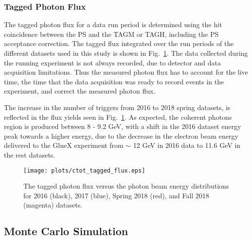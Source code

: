 \subsubsection{Tagged Photon Flux}
\label{chap.y2175.data_mc.data_tag_flux}

The tagged photon flux for a data run period is determined using the hit coincidence between the PS and the TAGM or TAGH, including the PS acceptance correction. The tagged flux integrated over the run periods of the different datasets used in this study is shown in Fig.~\ref{fig.y2175.data_mc.data_tag_flux}. The data collected during the running experiment  is not always recorded, due to detector and data acquisition limitations. Thus the measured photon flux has to account for the live time, the time that the data acquisition was ready to record events in the experiment, and correct the measured photon flux.
~\par The increase in the number of triggers from 2016 to 2018 spring datasets, is reflected in the flux yields seen in Fig.~\ref{fig.y2175.data_mc.data_tag_flux}. As expected, the coherent photons region is produced between 8 - 9.2 GeV, with a shift in the 2016 dataset energy peak towards a higher energy, due to the decrease in the electron beam energy delivered to the GlueX experiment from $\sim$ 12 GeV in 2016 data to 11.6 GeV in the rest datasets.

\begin{figure}[H]
    \centering
    \texttt{[image: plots/ctot\_tagged\_flux.eps]}
    \caption{\label{fig.y2175.data_mc.data_tag_flux}The tagged photon flux versus the photon beam energy distributions for 2016 (black), 2017 (blue), Spring 2018 (red), and Fall 2018 (magenta) datasets.}
\end{figure}

\subsection{Monte Carlo Simulation}
\label{chap.y2175.data_mc.mc}

